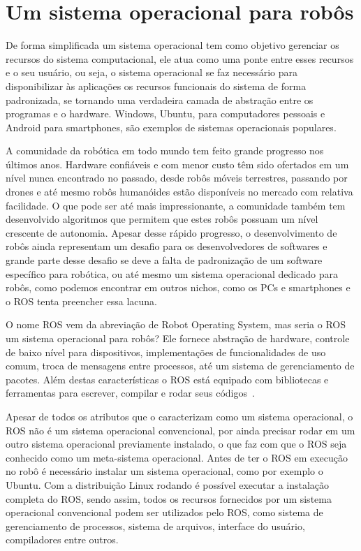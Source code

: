 \section{Um sistema operacional para robôs}

De forma simplificada um sistema operacional tem como objetivo gerenciar os recursos do sistema computacional, ele atua como uma ponte entre esses recursos e o seu usuário, ou seja, o sistema operacional se faz necessário para disponibilizar às aplicações os recursos funcionais do sistema de forma padronizada, se tornando uma verdadeira camada de abstração entre os programas e o hardware. Windows, Ubuntu, para computadores pessoais e Android para smartphones, são exemplos de sistemas operacionais populares.

A comunidade da robótica em todo mundo tem feito grande progresso nos últimos anos. Hardware confiáveis e com menor custo têm sido ofertados em um nível nunca encontrado no passado, desde robôs móveis terrestres, passando por drones e até mesmo robôs humanóides estão disponíveis no mercado com relativa facilidade. O que pode ser até mais impressionante, a comunidade também tem desenvolvido algoritmos que permitem que estes robôs possuam um nível crescente de autonomia. Apesar desse rápido progresso, o desenvolvimento de robôs ainda representam um desafio para os desenvolvedores de softwares e grande parte desse desafio se deve a falta de padronização de um software específico para robótica, ou até mesmo um sistema operacional dedicado para robôs, como podemos encontrar em outros nichos, como os PCs e smartphones e o ROS tenta preencher essa lacuna.

O nome ROS vem da abreviação de Robot Operating System, mas seria o ROS um sistema operacional para robôs? Ele fornece abstração de hardware, controle de baixo nível para dispositivos, implementações de funcionalidades de uso comum, troca de mensagens entre processos, até um sistema de gerenciamento de pacotes. Além destas características o ROS está equipado com bibliotecas e ferramentas para escrever, compilar e rodar seus códigos~\cite{RosIntro}.

Apesar de todos os atributos que o caracterizam como um sistema operacional, o ROS não é um sistema operacional convencional, por ainda precisar rodar em um outro sistema operacional previamente instalado, o que faz com que o ROS seja conhecido como um meta-sistema operacional. Antes de ter o ROS em execução no robô é necessário instalar um sistema operacional, como por exemplo o Ubuntu. Com a distribuição Linux rodando é possível executar a instalação completa do ROS, sendo assim, todos os recursos fornecidos por um sistema operacional convencional podem ser utilizados pelo ROS, como sistema de gerenciamento de processos, sistema de arquivos, interface do usuário, compiladores entre outros. 


